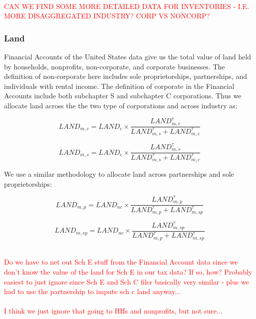 \documentclass[article,11pt,letterpaper,fleqn]{article}
\theoremstyle{definition}
\numberwithin{equation}{section}
\begin{document}
\ \\
\textcolor{red}{CAN WE FIND SOME MORE DETAILED DATA FOR INVENTORIES - I.E. MORE DISAGGREGATED INDUSTRY?  CORP VS NONCORP?}
\ \\

\subsubsection{Land}

Financial Accounts of the United States data give us the total value of land held by households, nonprofits, non-corporate, and corporate businesses.  The definition of non-corporate here includes sole proprietorships, partnerships, and individuals with rental income. The definition of corporate in the Financial Accounts include both subchapter S and subchapter C corporations.  Thus we allocate land across the the two type of corporations and across industry as:

\begin{equation}
{LAND}_{m,c}={LAND}_{c}\times \frac{{LAND}^{\tau}_{m,c}}{{LAND}^{\tau}_{m,s}+{LAND}^{\tau}_{m,c}}
\end{equation}

\begin{equation}
{LAND}_{m,s}={LAND}_{c}\times \frac{{LAND}^{\tau}_{m,s}}{{LAND}^{\tau}_{m,s}+{LAND}^{\tau}_{m,c}}
\end{equation}

\noindent\noindent We use a similar methodology to allocate land across partnerships and sole proprietorships:

\begin{equation}
{LAND}_{m,p}={LAND}_{nc}\times \frac{{LAND}^{\tau}_{m,p}}{{LAND}^{\tau}_{m,p}+{LAND}^{\tau}_{m,sp}}
\end{equation}

\begin{equation}
{LAND}_{m,sp}={LAND}_{nc}\times \frac{{LAND}^{\tau}_{m,sp}}{{LAND}^{\tau}_{m,p}+{LAND}^{\tau}_{m,sp}}
\end{equation}

\ \\
\textcolor{red}{Do we have to net out Sch E stuff from the Financial Account data since we don't know the value of the land for Sch E in our tax data?  If so, how?  Probably easiest to just ignore since Sch E and Sch C filer basically very similar - plus we had to use the partnership to impute sch c land anyway...}
\ \\

\ \\
\textcolor{red}{I think we just ignore that going to HHs and nonprofits, but not sure...}
\ \\
\end{document}
